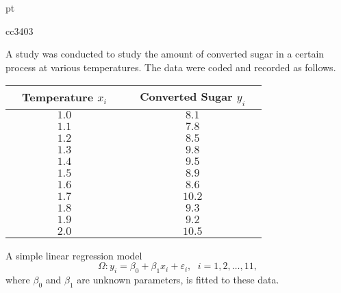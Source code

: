 \documentclass[12pt]{article}
\begin{document}
 pt

cc3403

\newpage


\vspace{0.35cm}

\noindent A study was conducted to study the amount of converted sugar in a certain process at various temperatures. The data were coded and recorded as follows.
\begin{center}
\begin{tabular}{|ccc|ccc|} \hline
& {\sf Temperature $x_i$} & & & {\sf Converted Sugar $y_i$} & \\ \hline\hline
& $1.0$ & & & $8.1$ & \\
& $1.1$ & & & $7.8$ & \\
& $1.2$ & & & $8.5$ & \\
& $1.3$ & & & $9.8$ & \\
& $1.4$ & & & $9.5$ & \\
& $1.5$ & & & $8.9$ & \\
& $1.6$ & & & $8.6$ & \\
& $1.7$ & & & $10.2$ & \\
& $1.8$ & & & $9.3$ & \\
& $1.9$ & & & $9.2$ & \\
& $2.0$ & & & $10.5$ & \\ \hline
\end{tabular}
\end{center}
\noindent A simple linear regression model
$$
\Omega: y_i = \beta_0 + \beta_1 x_i + \varepsilon_i, \ \ \, i = 1, 2, \dots, 11,
$$
where $\beta_0$ and $\beta_1$ are unknown parameters, is fitted to these data.
\end{document}
